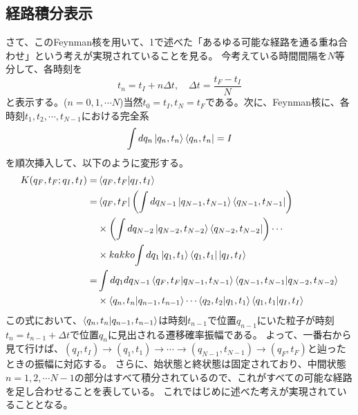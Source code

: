\documentclass[10pt]{jsarticle}
\newcommand{\kakko}[1]{\left(#1 \right)} %
\numberwithin{equation}{section}%
\begin{document}
\subsection{経路積分表示}
さて、このFeynman核を用いて、1で述べた「あるゆる可能な経路を通る重ね合わせ」という考えが実現されていることを見る。
今考えている時間間隔を$N$等分して、各時刻を
\begin{equation}
  t_{n}=t_{I}+n\Delta t, \quad \Delta t=\frac{t_{F}-t_{I}}{N}
\end{equation}
と表示する。($n=0,1,\cdots N$)当然$t_{0}=t_{I},t_{N}=t_{F}$である。次に、Feynman核に、各時刻$t_{1},t_{2},\cdots ,t_{N-1}$における完全系
\begin{equation}
  \int dq_{n}\ket{q_{n},t_{n}}\bra{q_{n},t_{n}}=I
\end{equation}
を順次挿入して、以下のように変形する。
\begin{align}
  K(q_{F},t_{F};q_{I},t_{I})=& \braket{q_{F},t_{F}|q_{I},t_{I}} \notag \\
    =& \bra{q_{F},t_{F}}\kakko{\int dq_{N-1}\ket{q_{N-1},t_{N-1}}\bra{q_{N-1},t_{N-1}}}\notag  \\
  & \times \kakko{\int dq_{N-2}\ket{q_{N-2},t_{N-2}}\bra{q_{N-2},t_{N-2}}}\cdots\notag \\\
  & \times kakko{\int dq_{1}\ket{q_{1},t_{1}}\bra{q_{1},t_{1}}} \ket{q_{I},t_{I}}\notag \\
  =& \int dq_{1}dq_{N-1}\braket{q_{F},t_{F}|q_{N-1},t_{N-1}}\braket{q_{N-1},t_{N-1}|q_{N-2},t_{N-2}}\notag \\
 \label{fkd}&\times \braket{q_{n},t_{n}|q_{n-1},t_{n-1}} \cdots \braket{q_{2},t_{2}|q_{1},t_{1}}\braket{q_{1},t_{1}|q_{I},t_{I}}
\end{align}
この式において、$\braket{q_{n},t_{n}|q_{n-1},t_{n-1}}$は時刻$t_{n-1}$で位置$q_{n-1}$にいた粒子が時刻$t_{n}=t_{n-1}+\Delta t$で位置$q_{n}$に見出される遷移確率振幅である。
よって、一番右から見て行けば、$(q_{I},t_{I})\to(q_{1},t_{1})\to \cdots \to (q_{N-1},t_{N-1})\to (q_{F},t_{F})$と辿ったときの振幅に対応する。
さらに、始状態と終状態は固定されており、中間状態$n=1,2,\cdots N-1$の部分はすべて積分されているので、これがすべての可能な経路を足し合わせることを表している。
これではじめに述べた考えが実現されていることとなる。
\end{document}
